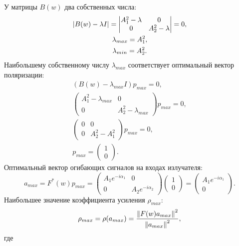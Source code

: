 У матрицы $B(w)$ два собственных числа:
\begin{gather*}
    \left | B(w) - \lambda I \right |
    = \begin{vmatrix}
          A_1^2 - \lambda & 0 \\
          0               & A_2^2 - \lambda
    \end{vmatrix} = 0, \\
    \lambda_{max} = A_1^2 , \\
    \lambda_{min} = A_2^2 .
\end{gather*}
Наибольшему собственному числу $\lambda_{max}$ соответствует оптимальный вектор поляризации:
\begin{gather*}
    (B(w) - \lambda_{max} I) p_{max} = 0 , \\
    \begin{pmatrix}
        A_1^2 - \lambda_{max} & 0 \\
        0                     & A_2^2 - \lambda_{max}
    \end{pmatrix}
    p_{max} = 0 , \\
    \begin{pmatrix}
        0 & 0 \\
        0 & A_2^2 - A_1^2
    \end{pmatrix}
    p_{max} = 0 , \\
    p_{max} = \begin{pmatrix}
                  1 \\
                  0
    \end{pmatrix} .
\end{gather*}
Оптимальный вектор огибающих сигналов на входах излучателя:
\[
    a_{max}
    = F^*(w) p_{max}
    = \begin{pmatrix}
          A_1 e^{- i \alpha_1} & 0 \\
          0                  & A_2 e^{- i \alpha_2}
    \end{pmatrix}
    \begin{pmatrix}
        1 \\
        0
    \end{pmatrix}
    = \begin{pmatrix}
          A_1 e^{- i \alpha_1} \\
          0
    \end{pmatrix} .
\]
Наибольшее значение коэффициента усиления $\rho_{max}$:
\[
    \rho_{max}
    = \rho(a_{max})
    = \frac{\left \| F(w) a_{max} \right \|^2}{\left \| a_{max} \right \|^2} ,
\]
где
